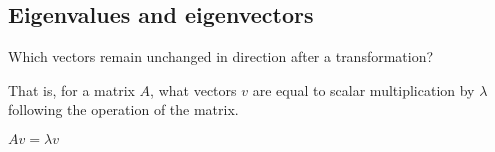 
\subsection{Eigenvalues and eigenvectors}

Which vectors remain unchanged in direction after a transformation?

That is, for a matrix \(A\), what vectors \(v\) are equal to scalar multiplication by \(\lambda \) following the operation of the matrix.

$Av=\lambda v$

